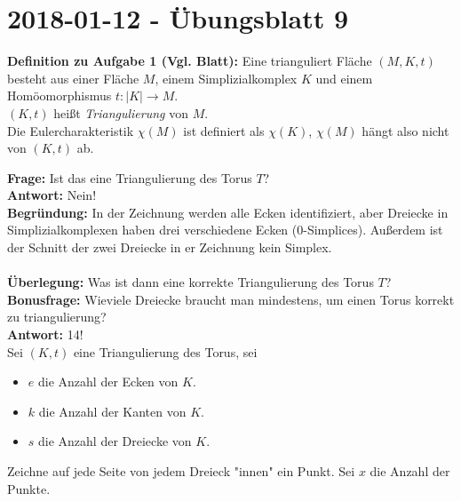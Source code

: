 

\section{2018-01-12 - Übungsblatt 9} %
\label{sec:2018_01_12_übungsblatt_9}
\textbf{Definition zu Aufgabe 1 (Vgl. Blatt):} Eine trianguliert Fläche $ (M, K, t) $ besteht aus einer Fläche $ M $, einem Simplizialkomplex $ K $ und einem Homöomorphismus $ t: \vert K \vert \to M $.\\
$ (K, t) $ heißt \emph{Triangulierung} von $ M $. \\
Die Eulercharakteristik $ \chi(M) $ ist definiert als $ \chi(K) $, $ \chi(M) $ hängt also nicht von $ (K,t) $ ab.

\begin{problem*}[1]
\textbf{Frage:} Ist das eine Triangulierung des Torus $ T $? \\
\textbf{Antwort:} Nein! \\
\textbf{Begründung:} In der Zeichnung werden alle Ecken identifiziert, aber Dreiecke in Simplizialkomplexen haben drei verschiedene Ecken (0-Simplices). Außerdem ist der Schnitt der zwei Dreiecke in er Zeichnung kein Simplex.\\
\\
\textbf{Überlegung:} Was ist dann eine korrekte Triangulierung des Torus $ T $?\\
\textbf{Bonusfrage:} Wieviele Dreiecke braucht man mindestens, um einen Torus korrekt zu triangulierung?\\
\textbf{Antwort:} 14! \\
Sei $ (K,t) $ eine Triangulierung des Torus, sei 
\begin{itemize}
    \item $ e$ die Anzahl der Ecken von $ K $.
    \item $ k$ die Anzahl der Kanten von $ K $.
    \item $ s$ die Anzahl der Dreiecke von $ K $.
  \end{itemize}  
Zeichne auf jede Seite von jedem Dreieck "innen" ein Punkt. Sei $ x $ die Anzahl der Punkte.

\end{problem*}
